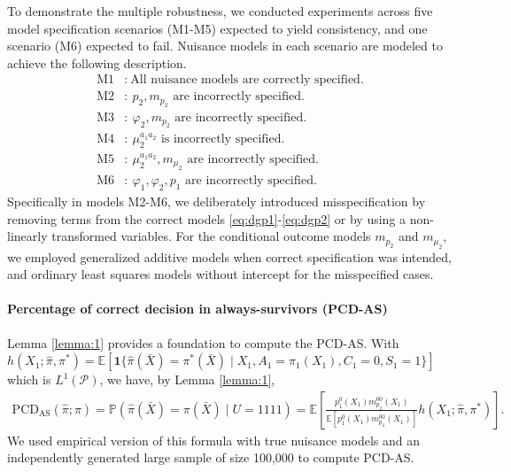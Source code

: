\documentclass{article}
\newcommand{\pk}{{\varphi}}
\newcommand{\pr}{\mathbb{P}}
\newcommand{\E}{\mathbb{E}}
\begin{document}
To demonstrate the multiple robustness, we conducted experiments across five model specification scenarios (M1-M5) expected to yield consistency, and one scenario (M6) expected to fail. Nuisance models in each scenario are modeled to achieve the following description.
\begin{align*}
	\text{M1}&:~ \textrm{All nuisance models are correctly specified.}\\
	\text{M2}&:~ p_2, m_{p_2} \textrm{ are incorrectly specified.}\\
	\text{M3}&:~ \pk_2, m_{p_2} \textrm{ are incorrectly specified.}\\
	\text{M4}&:~ \mu_2^{a_1a_2} \textrm{ is incorrectly specified.}\\
	\text{M5}&:~ \mu_2^{a_1a_2}, m_{\mu_2} \textrm{ are incorrectly specified.}\\
	\text{M6}&:~ \pk_1, \pk_2, p_1 \textrm{ are incorrectly specified.}
\end{align*}
Specifically in models M2-M6, we deliberately introduced misspecification by removing terms from the correct models \eqref{eq:dgp1}-\eqref{eq:dgp2} or by using a non-linearly transformed variables. 
For the conditional outcome models $m_{p_2}$ and $m_{\mu_2}$, we employed generalized additive models when correct specification was intended, and ordinary least squares models without intercept for the misspecified cases.

%
\paragraph{Percentage of correct decision in always-survivors (PCD-AS)} \label{A:pcdas}
Lemma \ref{lemma:1} provides a foundation to compute the PCD-AS. With $h(X_1;\hat\pi, \pi^*)=\E[ \mathbf 1\{\hat \pi(\bar X) = \pi^*(\bar X) \mid X_1, A_1=\pi_1(X_1), C_1=0, S_1=1\} ]$ which is $L^1(\mathcal P)$, we have, by Lemma \ref{lemma:1},
\begin{align*}
	\text{PCD}_\text{AS}(\hat\pi; \pi)
	= \pr\left( \hat\pi(\bar X) = \pi(\bar X) \mid U=1111 \right)
	= \E\left[ \frac{ p_1^0(X_1)m_{p_2}^{00}(X_1) }{\E\left[p_1^0(X_1)m_{p_2}^{00}(X_1)\right]} h(X_1; \hat \pi, \pi^*) \right].
\end{align*}
We used empirical version of this formula with true nuisance models and an independently generated large sample of size 100,000 to compute PCD-AS.


%
\end{document}
